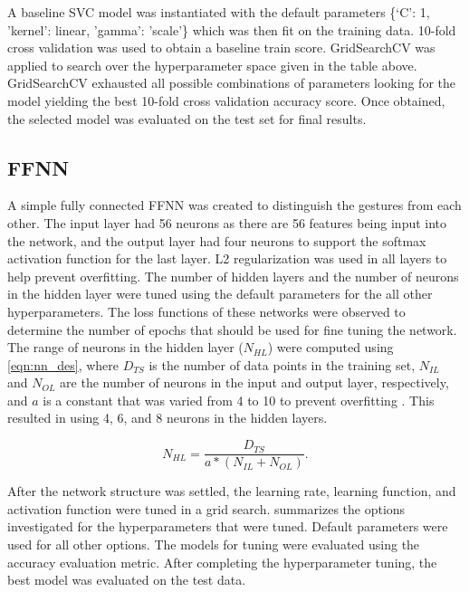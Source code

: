 \documentclass[journal]{IEEEtran}
\begin{document}
	A baseline SVC model was instantiated with the default parameters \{‘C’: 1, 'kernel': linear, 'gamma': 'scale'\} which was then fit on the training data. 10-fold cross validation was used to obtain a baseline train score. GridSearchCV was applied to search over the hyperparameter space given in the table above. GridSearchCV exhausted all possible combinations of parameters looking for the model yielding the best 10-fold cross validation accuracy score. Once obtained, the selected model was evaluated on the test set for final results.
	
	\subsection{FFNN}
	A simple fully connected FFNN was created to distinguish the gestures from each other. The input layer had 56 neurons as there are 56 features being input into the network, and the output layer had four neurons to support the softmax activation function for the last layer. L2 regularization was used in all layers to help prevent overfitting. The number of hidden layers and the number of neurons in the hidden layer were tuned using the default parameters for the all other hyperparameters. The loss functions of these networks were observed to determine the number of epochs that should be used for fine tuning the network. The range of neurons in the hidden layer ($N_{HL}$) were computed using \cref{eqn:nn_des}, where $D_{TS}$ is the number of data points in the training set, $N_{IL}$ and $N_{OL}$ are the number of neurons in the input and output layer, respectively, and $a$ is a constant that was varied from 4 to 10 to prevent overfitting \cite{demuth2014}. This resulted in using 4, 6, and 8 neurons in the hidden layers.
	
	\begin{equation}
	N_{HL}=\frac{D_{TS}}{a*(N_{IL}+N_{OL})}.
	\label{eqn:nn_des}
	\end{equation}
	
	After the network structure was settled, the learning rate, learning function, and activation function were tuned in a grid search.  summarizes the options investigated for the hyperparameters that were tuned. Default parameters were used for all other options. The models for tuning were evaluated using the accuracy evaluation metric. After completing the hyperparameter tuning, the best model was evaluated on the test data. 
	
\end{document}
